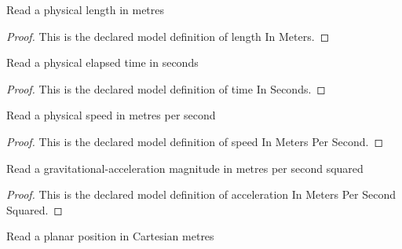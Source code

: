 \begin{definition}
  \label{def:physics:phyx-mini-0796:phyxminiproblems-problemphyxmini0796-lengthinmeters}
  Read a physical length in metres
\end{definition}
\begin{proof}
  This is the declared model definition of length In Meters.
\end{proof}
\begin{definition}
  \label{def:physics:phyx-mini-0796:phyxminiproblems-problemphyxmini0796-timeinseconds}
  Read a physical elapsed time in seconds
\end{definition}
\begin{proof}
  This is the declared model definition of time In Seconds.
\end{proof}
\begin{definition}
  \label{def:physics:phyx-mini-0796:phyxminiproblems-problemphyxmini0796-speedinmeterspersecond}
  Read a physical speed in metres per second
\end{definition}
\begin{proof}
  This is the declared model definition of speed In Meters Per Second.
\end{proof}
\begin{definition}
  \label{def:physics:phyx-mini-0796:phyxminiproblems-problemphyxmini0796-accelerationinmeterspersecondsquared}
  Read a gravitational-acceleration magnitude in metres per second squared
\end{definition}
\begin{proof}
  This is the declared model definition of acceleration In Meters Per Second Squared.
\end{proof}
\begin{definition}
  \label{def:physics:phyx-mini-0796:phyxminiproblems-problemphyxmini0796-positioninmeters}
  Read a planar position in Cartesian metres
\end{definition}
